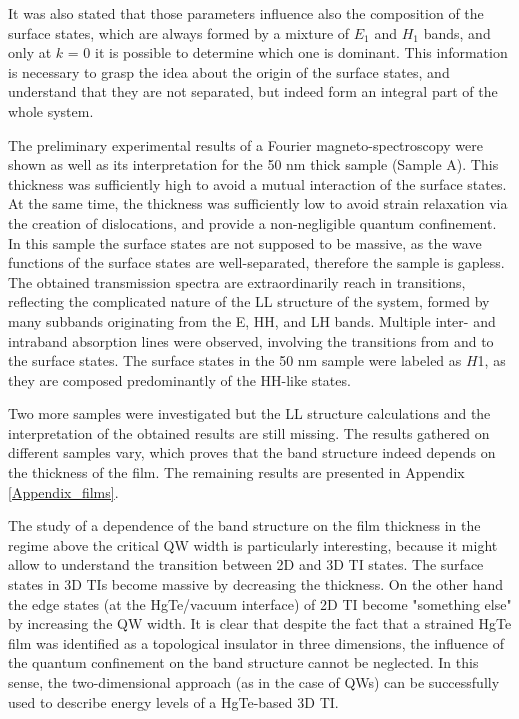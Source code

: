 \documentclass[titlepage,a4paper]{book}
\begin{document}
It was also stated that those parameters influence also the composition of the surface states, which are always formed by a mixture of $E_1$ and $H_1$ bands, and only at $k$ = 0 it is possible to determine which one is dominant. This information is necessary to grasp the idea about the origin of the surface states, and understand that they are not separated, but indeed form an integral part of the whole system.

The preliminary experimental results of a Fourier magneto-spectroscopy were shown as well as its interpretation for the 50 nm thick sample (Sample A). This thickness was sufficiently high to avoid a mutual interaction of the surface states. At the same time, the thickness was sufficiently low to avoid strain relaxation via the creation of dislocations, and provide a non-negligible quantum confinement. In this sample the surface states are not supposed to be massive, as the wave functions of the surface states are well-separated, therefore the sample is gapless. The obtained transmission spectra are extraordinarily reach in transitions, reflecting the complicated nature of the LL structure of the system, formed by many subbands originating from the E, HH, and LH bands. Multiple inter- and intraband absorption lines were observed, involving the transitions from and to the surface states. The surface states in the 50 nm sample were labeled as $H$1, as they are composed predominantly of the HH-like states.

Two more samples were investigated but the LL structure calculations and the interpretation of the obtained results are still missing. The results gathered on different samples vary, which proves that the band structure indeed depends on the thickness of the film. The remaining results are presented in Appendix \ref{Appendix_films}. 

The study of a dependence of the band structure on the film thickness in the regime above the critical QW width is particularly interesting, because it might allow to understand the transition between 2D and 3D TI states. The surface states in 3D TIs become massive by decreasing the thickness. On the other hand the edge states (at the HgTe/vacuum interface) of 2D TI become "something else" by increasing the QW width. It is clear that despite the fact that a strained HgTe film was identified as a topological insulator in three dimensions, the influence of the quantum confinement on the band structure cannot be neglected. In this sense, the two-dimensional approach (as in the case of QWs) can be successfully used to describe energy levels of a HgTe-based 3D TI. 
\end{document}
